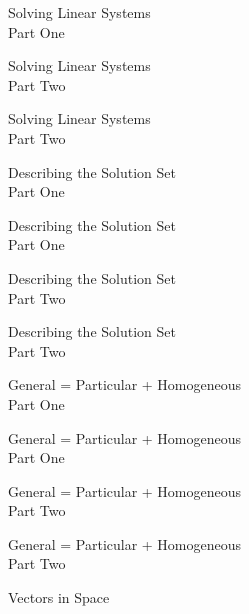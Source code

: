 \documentclass{titlescreen}
\begin{document}
\begin{videotitle}
  Solving Linear Systems \\[1ex]
  Part One
\end{videotitle}

\begin{videoend}
  Solving Linear Systems \\[1ex]
  Part Two
\end{videoend}

\begin{videotitle}
  Solving Linear Systems \\[1ex]
  Part Two
\end{videotitle}
\begin{videoend}
  Describing the Solution Set \\[1ex]
  Part One
\end{videoend}


\begin{videotitle}
  Describing the Solution Set \\[1ex]
  Part One
\end{videotitle}
\begin{videoend}
  Describing the Solution Set \\[1ex]
  Part Two
\end{videoend}

\begin{videotitle}
  Describing the Solution Set \\[1ex]
  Part Two
\end{videotitle}
\begin{videoend}
  General = Particular + Homogeneous \\[1ex]
  Part One
\end{videoend}


\begin{videotitle}
  General = Particular + Homogeneous \\[1ex]
  Part One
\end{videotitle}
\begin{videoend}
  General = Particular + Homogeneous \\[1ex]
  Part Two
\end{videoend}

\begin{videotitle}
  General = Particular + Homogeneous \\[1ex]
  Part Two
\end{videotitle}
\begin{videoend}
  Vectors in Space
\end{videoend}
\end{document}
